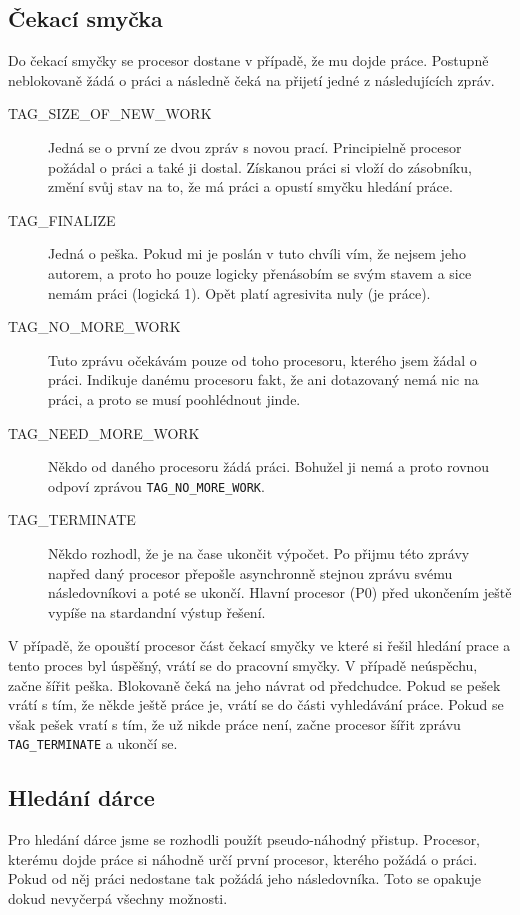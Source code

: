 \documentclass[12pt]{article}
\begin{document}
\subsection{Čekací smyčka}
Do čekací smyčky se procesor dostane v případě, že mu dojde práce. Postupně
neblokovaně žádá o práci a následně čeká na přijetí jedné z následujících zpráv.
\begin{description}
  \item [TAG\_SIZE\_OF\_NEW\_WORK] Jedná se o první ze dvou zpráv s novou prací.
Principielně procesor požádal o práci a také ji dostal. Získanou práci si vloží
do zásobníku, změní svůj stav na to, že má práci a opustí smyčku hledání práce.
  \item [TAG\_FINALIZE] Jedná o peška. Pokud mi je poslán v tuto chvíli vím, že
nejsem jeho autorem, a proto ho pouze logicky přenásobím se svým stavem a sice
nemám práci (logická 1). Opět platí agresivita nuly (je práce).  
  \item [TAG\_NO\_MORE\_WORK] Tuto zprávu očekávám pouze od toho procesoru,
kterého jsem žádal o práci. Indikuje danému procesoru fakt, že ani dotazovaný
nemá nic na práci, a proto se musí poohlédnout jinde.
  \item [TAG\_NEED\_MORE\_WORK] Někdo od daného procesoru žádá práci. Bohužel
ji nemá a proto rovnou odpoví zprávou \verb|TAG_NO_MORE_WORK|.
   \item [TAG\_TERMINATE] Někdo rozhodl, že je na čase ukončit výpočet. Po
přijmu této zprávy napřed daný procesor přepošle asynchronně stejnou zprávu
svému následovníkovi a poté se ukončí. Hlavní procesor (P0) před ukončením
ještě vypíše na stardandní výstup řešení.
\end{description}
V případě, že opouští procesor část čekací smyčky ve které si řešil hledání
prace a tento proces byl úspěšný, vrátí se do pracovní smyčky. V případě
neúspěchu, začne šířit peška. Blokovaně čeká na jeho návrat od předchudce. Pokud
se pešek vrátí s tím, že někde ještě práce je, vrátí se do části vyhledávání
práce. Pokud se však pešek vratí s tím, že už nikde práce není, začne
procesor šířit zprávu  \verb|TAG_TERMINATE| a ukončí se.
\subsection{Hledání dárce}
Pro hledání dárce jsme se rozhodli použít pseudo-náhodný přistup. Procesor,
kterému dojde práce si náhodně určí první procesor, kterého požádá o práci.
Pokud od něj práci nedostane tak požádá jeho následovníka. Toto se opakuje
dokud nevyčerpá všechny možnosti.
\end{document}
